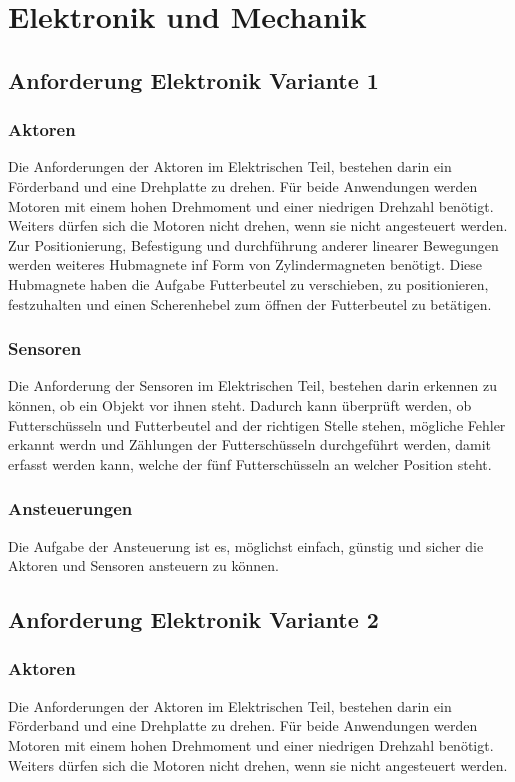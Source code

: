 \chapter{Elektronik und Mechanik}
\label{sec:elektronik-und-mechanik}

\section{Anforderung Elektronik Variante 1}
\subsection{Aktoren}
Die Anforderungen der Aktoren im Elektrischen Teil, bestehen darin ein Förderband und eine Drehplatte zu drehen. Für beide Anwendungen werden Motoren mit einem hohen Drehmoment und einer niedrigen Drehzahl benötigt. Weiters dürfen sich die Motoren nicht drehen, wenn sie nicht angesteuert werden.
Zur Positionierung, Befestigung und durchführung anderer linearer Bewegungen werden weiteres Hubmagnete inf Form von Zylindermagneten benötigt. Diese Hubmagnete haben die Aufgabe Futterbeutel zu verschieben, zu positionieren, festzuhalten und einen Scherenhebel zum öffnen der Futterbeutel zu betätigen.  
\subsection{Sensoren}
Die Anforderung der Sensoren im Elektrischen Teil, bestehen darin erkennen zu können, ob ein Objekt vor ihnen steht. Dadurch kann überprüft werden, ob Futterschüsseln und Futterbeutel and der richtigen Stelle stehen, mögliche Fehler erkannt werdn und Zählungen der Futterschüsseln durchgeführt werden, damit erfasst werden kann, welche der fünf Futterschüsseln an welcher Position steht.
\subsection{Ansteuerungen}
Die Aufgabe der Ansteuerung ist es, möglichst einfach, günstig und sicher die Aktoren und Sensoren ansteuern zu können.

\section{Anforderung Elektronik Variante 2}
\subsection{Aktoren}
Die Anforderungen der Aktoren im Elektrischen Teil, bestehen darin ein Förderband und eine Drehplatte zu drehen. Für beide Anwendungen werden Motoren mit einem hohen Drehmoment und einer niedrigen Drehzahl benötigt. Weiters dürfen sich die Motoren nicht drehen, wenn sie nicht angesteuert werden.
